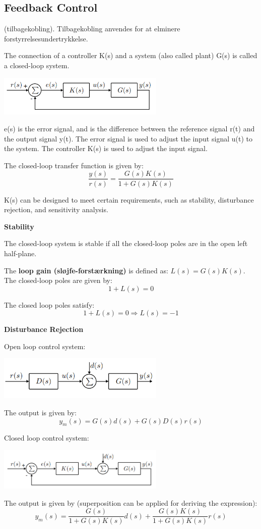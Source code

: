 \subsection{Feedback Control}
(tilbagekobling). Tilbagekobling anvendes for at elminere forstyrrelsesundertrykkelse.

The connection of a controller K(s) and a system (also called plant) G(s) is called a closed-loop system.
\begin{center}
	\includegraphics[width=0.6\textwidth]{Images/feedbackControl.png}
\end{center}

e(s) is the error signal, and is the difference between the reference signal r(t) and the output signal y(t).
The error signal is used to adjust the input signal u(t) to the system. The controller K(s) is used to adjust the input signal.

The closed-loop transfer function is given by:
$$\frac{y(s)}{r(s)} = \frac{G(s)K(s)}{1+G(s)K(s)}$$

K(s) can be designed to meet certain requirements, such as stability, disturbance rejection, and sensitivity analysis.


\textbf{Stability}

The closed-loop system is stable if all the closed-loop poles are in the
open left half-plane.

The \textbf{loop gain (sløjfe-forstærkning)} is defined as: $L(s) = G(s)K(s)$.
The closed-loop poles are given by:
$$1+L(s) = 0$$

The closed loop poles satisfy:
$$1+L(s) = 0 \Rightarrow L(s) = -1$$

\textbf{Disturbance Rejection}

Open loop control system:
\begin{center}
	\includegraphics[width=0.6\textwidth]{Images/openLoop.png}
\end{center}
The output is given by:
$$y_m(s)=G(s)d(s)+G(s)D(s)r(s)$$


Closed loop control system:
\begin{center}
	\includegraphics[width=0.6\textwidth]{Images/closedLoop.png}
\end{center}
The output is given by (superposition can be applied for deriving the expression):
$$y_m(s) = \frac{G(s)}{1+G(s)K(s)}d(s) + \frac{G(s)K(s)}{1+G(s)K(s)}r(s)$$


